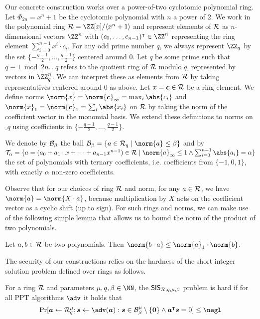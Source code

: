 
Our concrete construction works over a power-of-two cyclotomic polynomial ring.
Let $\Phi_{2n} = x^n+1$ be the cyclotomic polynomial with $n$ a power of 2. 
We work in the polynomial ring $\ring =  \ZZ[x]/\langle x^n+1\rangle$ and represent elements of $\mathcal{R}$ as $n$-dimensional vectors $\ZZ^n$ with $(c_0,\dots,c_{n-1})^\transpose\in \ZZ^n$ representing the ring element $\sum_{i=0}^{n-1} x^i \cdot c_i$.
For any odd prime number $q$, we always represent $\ZZ_q$ by the set $\{-\tfrac{q-1}{2},\ldots,\tfrac{q-1}{2}\}$ centered around 0.
Let $q$  be some prime such that $q \equiv 1 \bmod 2n$.
$\ring_q$ refers to the quotient ring of $\mathcal{R}$ modulo $q$, represented by vectors in $\ZZ_q^n$. We can interpret these as elements from $\mathcal{R}$ by taking representatives centered around 0 as above.
Let $x = \boldsymbol{c} \in \mathcal{R}$ be a ring element.
We define norms $\norm{x} = \norm{\vec{c}}_\infty = \max_{i}\abs{c_i}$ and $\norm{x}_1 = \norm{\vec{c}}_1 = \sum_{i}\abs{x_i}$ on $\mathcal{R}$ by taking the norm of the coefficient vector in the monomial basis.
We extend these definitions to norms on $\ring_q$ using coefficients in $\{-\tfrac{q-1}{2},\ldots,\tfrac{q-1}{2}\}$.

We denote by $\mathcal{B}_\beta$ the ball $\ball_\beta = \{a\in\ring_q\mid \norm{a}\leq\beta\}$ and by 
$\tern_\alpha = \{a=(a_0+a_1\cdot x + \dots + a_{n-1}x^{n-1}) \in\ring \mid \norm{a}_\infty\leq 1 \land \sum_{i=0}^{n-1} \abs{a_i} = \alpha\}$ %
the set of polynomials with ternary coefficients, i.e. coefficients from $\{-1,0,1\}$, with exactly $\alpha$ non-zero coefficients.

Observe that for our choices of ring $\mathcal{R}$ and norm, for any $a\in\mathcal{R}$, we have $\norm{a} = \norm{X\cdot a}$, because multiplication by $X$ acts on the coefficient vector as a cyclic shift (up to sign).
For such rings and norms, we can make use of the following simple lemma that allows us to bound the norm of the product of two polynomials.
\begin{lemma}\label{lem:ternbound}
  Let $a,b\in\mathcal{R}$ be two polynomials. Then $\norm{b\cdot a} \leq \norm{a}_1\cdot\norm{b}$.
\end{lemma}

The security of our constructions relies on the hardness of the short integer solution problem defined over rings as follows.
\begin{definition}
  For a ring $\mathcal{R}$ and parameters $\mu,q,\beta \in \NN$, the $\mathsf{SIS}_{\mathcal{R},q,\mu,\beta}$ problem is hard if for all PPT algorithms $\adv$ it holds that
  \[
    \Pr[
      \vec{a} \gets \ring_q^\mu; \vec{s}\gets\adv(\vec{a}) : \vec{s}\in\ball_\beta^\mu\setminus\{\vec{0}\} \land \vec{a}^\transpose\vec{s}=0
    ] \leq \negl
  \]
\end{definition}
